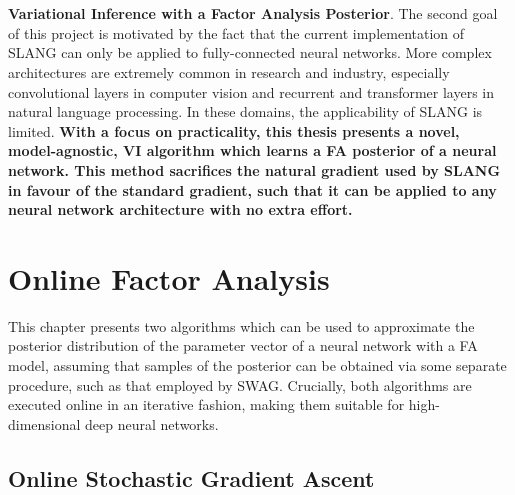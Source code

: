 \documentclass[msc,deptreport.inf]{infthesis} %
\begin{document}
\\ \\
\textbf{Variational Inference with a Factor Analysis Posterior}.
The second goal of this project is motivated by the fact that the current implementation of SLANG can only be applied to fully-connected neural networks. More complex architectures are extremely common in research and industry, especially convolutional layers \cite{krizhevsky09} in computer vision and recurrent \cite{hochreiter1997} and transformer \cite{vaswani2017} layers in natural language processing. In these domains, the applicability of SLANG is limited. \textbf{With a focus on practicality, this thesis presents a novel, model-agnostic, VI algorithm which learns a FA posterior of a neural network. This method sacrifices the natural gradient used by SLANG in favour of the standard gradient, such that it can be applied to any neural network architecture with no extra effort.} 


\chapter{Online Factor Analysis}\label{ch:online_fa}

This chapter presents two algorithms which can be used to approximate the posterior distribution of the parameter vector of a neural network with a FA model, assuming that samples of the posterior can be obtained via some separate procedure, such as that employed by SWAG. Crucially, both algorithms are executed online in an iterative fashion, making them suitable for high-dimensional deep neural networks.

\section{Online Stochastic Gradient Ascent}\label{sec:gradient_fa}
\end{document}
